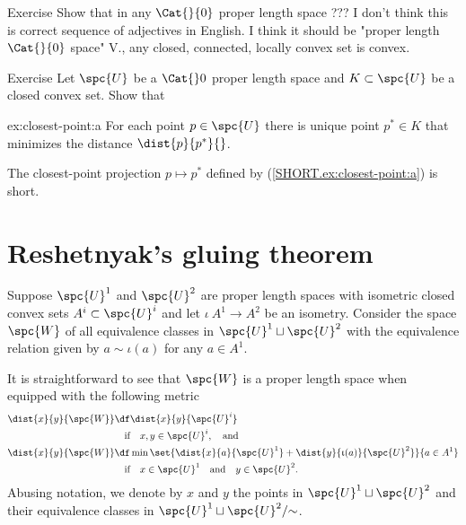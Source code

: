 \begin{thm}{Exercise}\label{ex:locally-convex}
Show that in any $\Cat{}{0}$ proper length space{\color{red} ??? I don't think this is  correct sequence of adjectives in English. I think it should be "proper length $\Cat{}{0}$ space" V.}, any closed, connected, locally convex set is convex.
\end{thm}

\begin{thm}{Exercise}\label{ex:closest-point}
Let  $\spc{U}$ be a $\Cat{}0$ proper length space 
and $K\subset \spc{U}$ be a closed convex set.
Show that 

\begin{subthm}{ex:closest-point:a}
For each point $p\in \spc{U}$ there is unique point $p^*\in K$ that minimizes the distance $\dist{p}{p^*}{}$.
\end{subthm}

\begin{subthm}{}
The closest-point projection $p\mapsto p^*$ defined by (\ref{SHORT.ex:closest-point:a}) is short. 
\end{subthm}

\end{thm}


\section{Reshetnyak's gluing theorem}\label{sec:cba-gluing}

Suppose 
$\spc{U}^1$ and $\spc{U}^2$ are proper length spaces 
with isometric closed convex sets $A^i\subset\spc{U}^i$ and let $\iota\:A^1\to A^2$ be an isometry.
Consider the space $\spc{W}$ of all equivalence classes in $\spc{U}^1\sqcup\spc{U}^2$ with the equivalence relation given by $a\sim\iota(a)$ for any $a\in A^1$.

It is straightforward to see that $\spc{W}$ is a proper length space when equipped with the following metric
\begin{align*}
\dist{x}{y}{\spc{W}}&\df\dist{x}{y}{\spc{U}^i}
\\
&\quad\text{if}\quad x,y\in \spc{U}^i,\quad\text{and}
\\
\dist{x}{y}{\spc{W}}&\df\min\set{\dist{x}{a}{\spc{U}^1}+\dist{y}{\iota(a)}{\spc{U}^2}}{a\in A^1}
\\
&\quad\text{if}\quad x\in \spc{U}^1\quad\text{and}\quad y\in \spc{U}^2.
\end{align*}
Abusing notation, we denote by $x$ and $y$ the points in $\spc{U}^1\sqcup\spc{U}^2$ and their equivalence classes in $\spc{U}^1\sqcup\spc{U}^2/{{\sim}}$.

